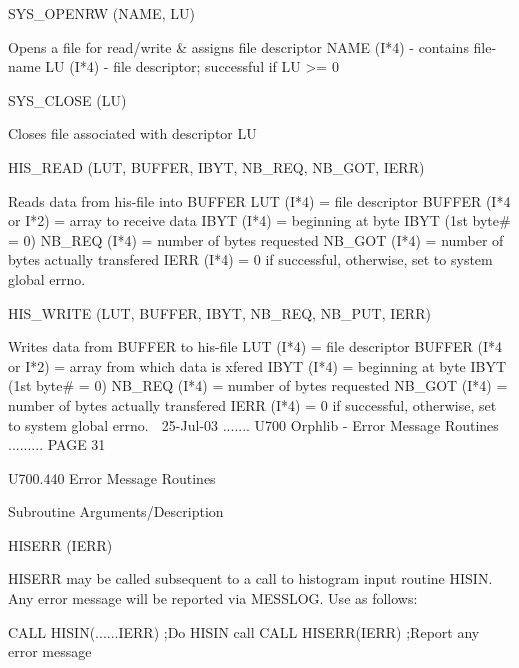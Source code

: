    SYS_OPENRW         (NAME, LU)
 
                       Opens a file for read/write & assigns file descriptor
                       NAME (I*4) - contains file-name
                       LU   (I*4) - file descriptor; successful if LU >= 0
 
   SYS_CLOSE          (LU)
 
                       Closes file associated with descriptor LU
 
   HIS_READ           (LUT, BUFFER, IBYT, NB_REQ, NB_GOT, IERR)
 
                       Reads data from his-file into BUFFER
                       LUT    (I*4) = file descriptor
                       BUFFER (I*4 or I*2) = array to receive data
                       IBYT   (I*4) = beginning at byte IBYT (1st byte# = 0)
                       NB_REQ (I*4) = number of bytes requested
                       NB_GOT (I*4) = number of bytes actually transfered
                       IERR   (I*4) = 0 if successful, otherwise,
                                      set to system global errno.
 
   HIS_WRITE          (LUT, BUFFER, IBYT, NB_REQ, NB_PUT, IERR)
 
                       Writes data from BUFFER to his-file
                       LUT    (I*4) = file descriptor
                       BUFFER (I*4 or I*2) = array from which data is xfered
                       IBYT   (I*4) = beginning at byte IBYT (1st byte# = 0)
                       NB_REQ (I*4) = number of bytes requested
                       NB_GOT (I*4) = number of bytes actually transfered
                       IERR   (I*4) = 0 if successful, otherwise,
                                      set to system global errno.
    
   25-Jul-03 ....... U700  Orphlib - Error Message Routines ......... PAGE  31
 
 
   U700.440  Error Message Routines
 
   Subroutine          Arguments/Description
 
   HISERR             (IERR)
 
                       HISERR may be called subsequent to a call to histogram
                       input routine HISIN. Any error message will be reported
                       via MESSLOG. Use as follows:
 
                       CALL HISIN(......IERR)       ;Do HISIN call
                       CALL HISERR(IERR)            ;Report any error message
 
